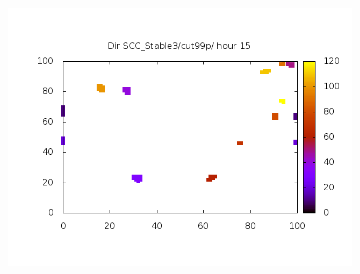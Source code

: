 \documentclass[10pt,a4paper]{article}
\begin{document}
\begin{figure}
\begin{subfigure}[b]{1\textwidth}
\includegraphics[scale=.4]{./img/SCC_Stable3/cut99p/15.png}
\end{subfigure}


\end{figure}
\end{document}
